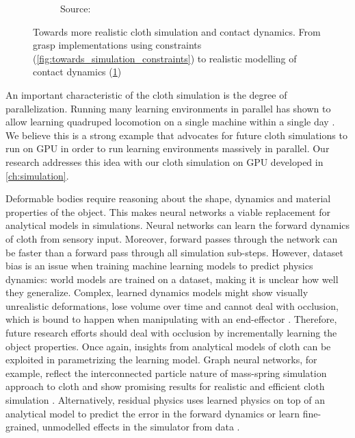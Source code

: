 \documentclass[\home/main.tex]{subfiles}
\begin{document}
\begin{figure}[htpb]{}
\begin{subfigure}[b]{0.80\textwidth}
        \caption{Source: \autocite{li2021diffcloth}}
        \label{fig:towards_simulation_contacts}
    \end{subfigure}
    \caption[Progress of cloth simulation for control tasks.]{Towards more realistic cloth simulation and contact dynamics. From grasp implementations using constraints (\cref{fig:towards_simulation_constraints}) to realistic modelling of contact dynamics (\cref{fig:towards_simulation_contacts})}
    \label{fig:towards_simulation}
\end{figure}

An important characteristic of the cloth simulation is the degree of parallelization. Running many learning environments in parallel has shown to allow learning quadruped locomotion on a single machine within a single day \autocite{rudin2021learning}. We believe this is a strong example that advocates for future cloth simulations to run on GPU in order to run learning environments massively in parallel. Our research addresses this idea with our cloth simulation on \gls{GPU} developed in \cref{ch:simulation}.

Deformable bodies require reasoning about the shape, dynamics and material properties of the object. This makes neural networks a viable replacement for analytical models in simulations. Neural networks can learn the forward dynamics of cloth from sensory input. Moreover, forward passes through the network can be faster than a forward pass through all simulation sub-steps.
However, dataset bias is an issue when training machine learning models to predict physics dynamics: world models are trained on a dataset, making it is unclear how well they generalize. Complex, learned dynamics models might show visually unrealistic deformations, lose volume over time and cannot deal with occlusion, which is bound to happen when manipulating with an end-effector \autocite{Mrowca2018, Li2018}. Therefore, future research efforts should deal with occlusion by incrementally learning the object properties.
Once again, insights from analytical models of cloth can be exploited in parametrizing the learning model. Graph neural networks, for example, reflect the interconnected particle nature of mass-spring simulation approach to cloth and show promising results for realistic and efficient cloth simulation \autocite{pfaff2021learning}. Alternatively, residual physics uses learned physics on top of an analytical model to predict the error in the forward dynamics \autocite{Golemo2018} or learn fine-grained, unmodelled effects in the simulator from data \autocite{heiden2021neuralsim}.
\end{document}
